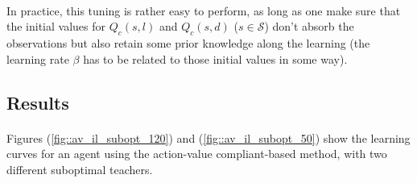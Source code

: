 \documentclass[a4paper]{report}
\begin{document}
{{{{				\paragraph{} In practice, this tuning is rather easy to perform, as long as one make sure that the initial values for $Q_c(s,l)$ and $Q_c(s,d)$ ($s\in\mathcal{S}$) don't absorb the observations but also retain some prior knowledge along the learning (the learning rate $\beta$ has to be related to those initial values in some way). 
			}
			\subsection{Results}
			{
				 \paragraph{} Figures (\ref{fig::av_il_subopt_120}) and (\ref{fig::av_il_subopt_50}) show the learning curves for an agent using the action-value compliant-based method, with two different suboptimal teachers. 
				 
}}}}
\end{document}
